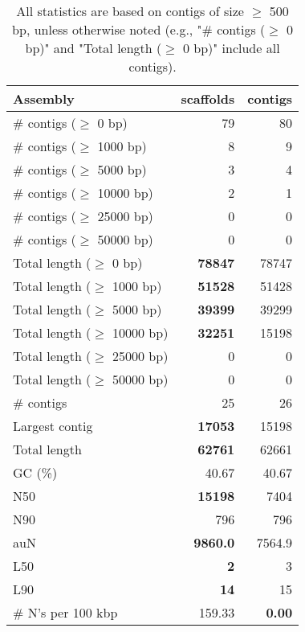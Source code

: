 \documentclass[12pt,a4paper]{article}
\begin{document}
\begin{table}[ht]
\begin{center}
\caption{All statistics are based on contigs of size $\geq$ 500 bp, unless otherwise noted (e.g., "\# contigs ($\geq$ 0 bp)" and "Total length ($\geq$ 0 bp)" include all contigs).}
\begin{tabular}{|l*{2}{|r}|}
\hline
Assembly & scaffolds & contigs \\ \hline
\# contigs ($\geq$ 0 bp) & 79 & 80 \\ \hline
\# contigs ($\geq$ 1000 bp) & 8 & 9 \\ \hline
\# contigs ($\geq$ 5000 bp) & 3 & 4 \\ \hline
\# contigs ($\geq$ 10000 bp) & 2 & 1 \\ \hline
\# contigs ($\geq$ 25000 bp) & 0 & 0 \\ \hline
\# contigs ($\geq$ 50000 bp) & 0 & 0 \\ \hline
Total length ($\geq$ 0 bp) & {\bf 78847} & 78747 \\ \hline
Total length ($\geq$ 1000 bp) & {\bf 51528} & 51428 \\ \hline
Total length ($\geq$ 5000 bp) & {\bf 39399} & 39299 \\ \hline
Total length ($\geq$ 10000 bp) & {\bf 32251} & 15198 \\ \hline
Total length ($\geq$ 25000 bp) & 0 & 0 \\ \hline
Total length ($\geq$ 50000 bp) & 0 & 0 \\ \hline
\# contigs & 25 & 26 \\ \hline
Largest contig & {\bf 17053} & 15198 \\ \hline
Total length & {\bf 62761} & 62661 \\ \hline
GC (\%) & 40.67 & 40.67 \\ \hline
N50 & {\bf 15198} & 7404 \\ \hline
N90 & 796 & 796 \\ \hline
auN & {\bf 9860.0} & 7564.9 \\ \hline
L50 & {\bf 2} & 3 \\ \hline
L90 & {\bf 14} & 15 \\ \hline
\# N's per 100 kbp & 159.33 & {\bf 0.00} \\ \hline
\end{tabular}
\end{center}
\end{table}
\end{document}
